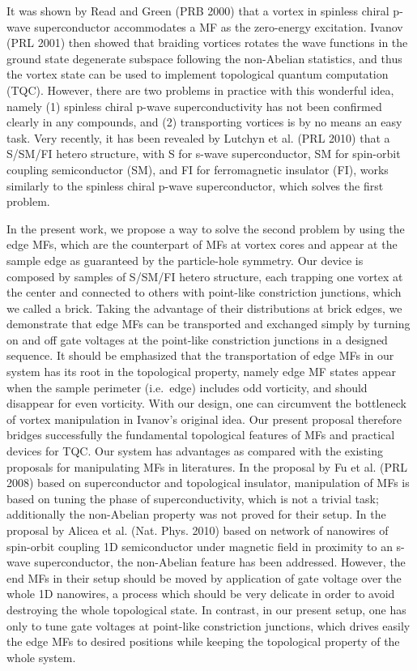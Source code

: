 \documentclass[11pt]{article}
\begin{document}
It was shown by Read and Green (PRB 2000) that a vortex in spinless
chiral p-wave superconductor accommodates a MF as the zero-energy
excitation. Ivanov (PRL 2001) then showed that braiding vortices rotates
the wave functions in the ground state degenerate subspace following the
non-Abelian statistics, and thus the vortex state can be used to
implement topological quantum computation (TQC). However, there are two
problems in practice with this wonderful idea, namely (1) spinless
chiral p-wave superconductivity has not been confirmed clearly in any
compounds, and (2) transporting vortices is by no means an easy task.
Very recently, it has been revealed by Lutchyn et al. (PRL 2010) that a
S/SM/FI hetero structure, with S for s-wave superconductor, SM for
spin-orbit coupling semiconductor (SM), and FI for ferromagnetic
insulator (FI), works similarly to the spinless chiral p-wave
superconductor, which solves the first problem.

In the present work, we propose a way to solve the second problem by
using the edge MFs, which are the counterpart of MFs at vortex cores and
appear at the sample edge as guaranteed by the particle-hole symmetry.
Our device is composed by samples of S/SM/FI hetero structure, each
trapping one vortex at the center and connected to others with
point-like constriction junctions, which we called a brick. Taking the
advantage of their distributions at brick edges, we demonstrate that
edge MFs can be transported and exchanged simply by turning on and off
gate voltages at the point-like constriction junctions in a designed
sequence. It should be emphasized that the transportation of edge MFs in
our system has its root in the topological property, namely edge MF
states appear when the sample perimeter (i.e.~edge) includes odd
vorticity, and should disappear for even vorticity. With our design, one
can circumvent the bottleneck of vortex manipulation in Ivanov's
original idea. Our present proposal therefore bridges successfully the
fundamental topological features of MFs and practical devices for TQC.
Our system has advantages as compared with the existing proposals for
manipulating MFs in literatures. In the proposal by Fu et al. (PRL 2008)
based on superconductor and topological insulator, manipulation of MFs
is based on tuning the phase of superconductivity, which is not a
trivial task; additionally the non-Abelian property was not proved for
their setup. In the proposal by Alicea et al. (Nat. Phys. 2010) based on
network of nanowires of spin-orbit coupling 1D semiconductor under
magnetic field in proximity to an s-wave superconductor, the non-Abelian
feature has been addressed. However, the end MFs in their setup should
be moved by application of gate voltage over the whole 1D nanowires, a
process which should be very delicate in order to avoid destroying the
whole topological state. In contrast, in our present setup, one has only
to tune gate voltages at point-like constriction junctions, which drives
easily the edge MFs to desired positions while keeping the topological
property of the whole system.
\end{document}
